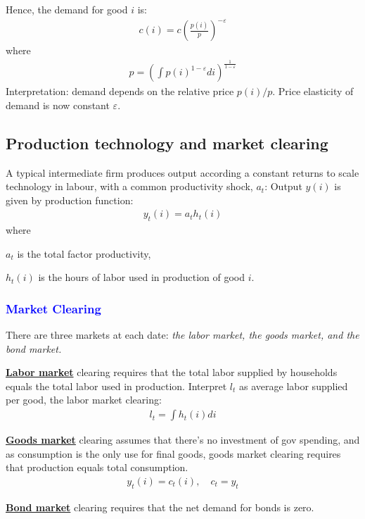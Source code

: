 Hence, the demand for good $i$ is:
\begin{align*}
    c(i) = c \left( \frac{p(i)}{p} \right)^{-\varepsilon}
\end{align*}
where
\begin{align*}
    p = \left( \int p(i)^{1-\varepsilon} di \right)^{\frac{1}{1-\varepsilon}}
\end{align*}
Interpretation: demand depends on the relative price $p(i)/p$.
Price elasticity of demand is now constant $\varepsilon$.

\subsection{Production technology and market clearing}
A typical intermediate firm produces output according a constant returns to scale technology in labour,
with a common productivity shock, $a_t$:
Output $y(i)$ is given by production function:
\begin{align*}
    y_t(i) = a_t h_t(i)
\end{align*}
where

$a_t$ is the total factor productivity,

$h_t(i)$ is the hours of labor used in production of good $i$.

\subsubsection{\textcolor{blue}{Market Clearing}}

There are three markets at each date: \textit{the labor market, the goods
market, and the bond market.}

\underline{\textbf{Labor market}} clearing requires that the total labor supplied
by households equals the total labor used in production.
Interpret $l_t$ as average labor supplied per good, the labor market clearing:
\begin{align*}
    l_t = \int h_t(i) di
\end{align*}

\underline{\textbf{Goods market}} clearing assumes that there's no investment of gov spending,
and as consumption is the only use for final goods, 
goods market clearing requires that production equals total consumption.
\begin{align*}
    y_t(i) = c_t(i), \quad c_t = y_t
\end{align*}

\underline{\textbf{Bond market}} clearing requires that the net demand for bonds is zero.


